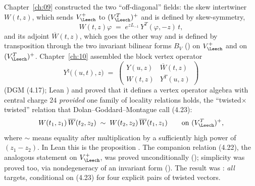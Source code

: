 Chapter~\ref{ch:09} constructed the two ``off-diagonal'' fields: the skew intertwiner $W(t,z)$,
which sends $V_\Leech^+$ to $(V_\Leech^T)^+$ and is defined by skew-symmetry,
\begin{equation*}
  W(t,z)\varphi \;=\; e^{zL_{-1}}\,Y^{T}(\varphi,-z)\,t,
\end{equation*}
and its adjoint $\overline W(t,z)$, which goes the other way and is defined by transposition
through the two invariant bilinear forms $B_V$ () on $V_\Leech^+$ and
 on $(V_\Leech^T)^+$.  Chapter~\ref{ch:10} assembled the block vertex operator
\begin{equation}\label{ch14:eq:block}
  Y^{\natural}\bigl((u,t),z\bigr) \;=\;
  \begin{pmatrix} Y(u,z) & \overline W(t,z)\\ W(t,z) & Y^{T}(u,z)\end{pmatrix}
\end{equation}
(DGM (4.17); Lean ) and proved that it defines a vertex operator algebra with
central charge $24$ \emph{provided} one family of locality relations holds, the
``twisted$\times$twisted'' relation that Dolan--Goddard--Montague call (4.23):
\begin{equation}\label{ch14:eq:423}
  W(t_1,z_1)\,\overline W(t_2,z_2)\;\sim\;W(t_2,z_2)\,\overline W(t_1,z_1)
  \qquad\text{on }(V_\Leech^{T})^{+},
\end{equation}
where $\sim$ means equality after multiplication by a sufficiently high power of $(z_1-z_2)$.
In Lean this is the proposition .  The companion relation
(4.22), the analogous statement on $V_\Leech^+$, was proved unconditionally
(); simplicity was proved too, via nondegeneracy of an invariant form
().  The result was : \emph{all}
targets, conditional on (4.23) for four explicit pairs of twisted vectors.


